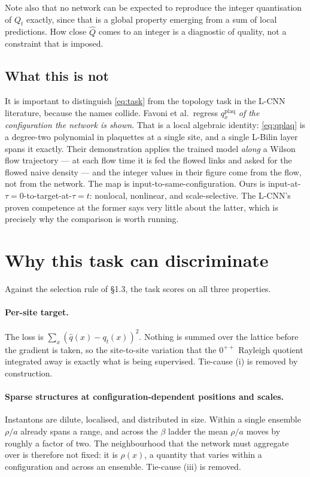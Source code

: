 \documentclass[11pt,a4paper]{article}
\newcommand{\qhat}{\hat{q}}
\newcommand{\Qhat}{\hat{Q}}
\newcommand{\qflow}{q_{t}}
\newcommand{\Qflow}{Q_{t}}
\begin{document}
Note also that no network can be expected to reproduce the integer quantisation
of $\Qflow$ exactly, since that is a global property emerging from a sum of local
predictions. How close $\Qhat$ comes to an integer is a diagnostic of quality,
not a constraint that is imposed.

\subsection{What this is not}
\label{sec:notthis}

It is important to distinguish \eqref{eq:task} from the topology task in the
L-CNN literature, because the names collide. Favoni et al.\ regress
$q^{\mathrm{plaq}}_x$ \emph{of the configuration the network is shown}. That is
a local algebraic identity: \eqref{eq:qplaq} is a degree-two polynomial in
plaquettes at a single site, and a single L-Bilin layer spans it exactly. Their
demonstration applies the trained model \emph{along} a Wilson flow trajectory ---
at each flow time it is fed the flowed links and asked for the flowed naive
density --- and the integer values in their figure come from the flow, not from
the network. The map is input-to-same-configuration. Ours is
input-at-$\tau=0$-to-target-at-$\tau=t$: nonlocal, nonlinear, and
scale-selective. The L-CNN's proven competence at the former says very little
about the latter, which is precisely why the comparison is worth running.

\section{Why this task can discriminate}

Against the selection rule of \S1.3, the task scores on all three properties.

\paragraph{Per-site target.} The loss is $\sum_x (\qhat(x) - \qflow(x))^2$.
Nothing is summed over the lattice before the gradient is taken, so the
site-to-site variation that the $0^{++}$ Rayleigh quotient integrated away is
exactly what is being supervised. Tie-cause (i) is removed by construction.

\paragraph{Sparse structures at configuration-dependent positions and scales.}
Instantons are dilute, localised, and distributed in size. Within a single
ensemble $\rho/a$ already spans a range, and across the $\beta$ ladder the mean
$\rho/a$ moves by roughly a factor of two. The neighbourhood that the network
must aggregate over is therefore not fixed: it is $\rho(x)$, a quantity that
varies within a configuration and across an ensemble. Tie-cause (iii) is removed.
\end{document}
